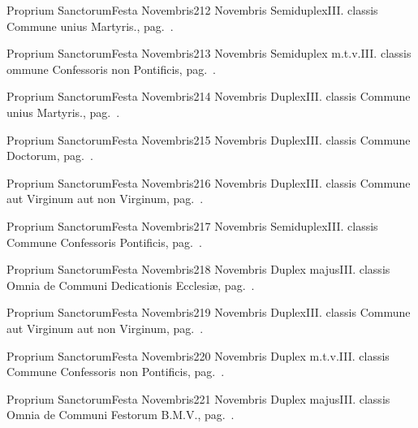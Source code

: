 \documentclass[nocturnale-romanum.tex]{subfiles}
\begin{document}
	{Proprium Sanctorum}{Festa Novembris}{2}{12 Novembris}
	{Semiduplex}{III. classis}
	{Commune unius Martyris., pag.\ \pageref{M-UMEX}.}
	{}

	{Proprium Sanctorum}{Festa Novembris}{2}{13 Novembris}
	{Semiduplex m.t.v.}{III. classis}
	{ommune Confessoris non Pontificis, pag.\ \pageref{M-CONP}.}
	{}

	{Proprium Sanctorum}{Festa Novembris}{2}{14 Novembris}
	{Duplex}{III. classis}
	{Commune unius Martyris., pag.\ \pageref{M-UMEX}.}
	{}

	{Proprium Sanctorum}{Festa Novembris}{2}{15 Novembris}
	{Duplex}{III. classis}
	{Commune Doctorum, pag.\ \pageref{M-CODO}.}
	{}

	{Proprium Sanctorum}{Festa Novembris}{2}{16 Novembris}
	{Duplex}{III. classis}
	{Commune aut Virginum aut non Virginum, pag.\ \pageref{M-MU}.}
	{}

	{Proprium Sanctorum}{Festa Novembris}{2}{17 Novembris}
	{Semiduplex}{III. classis}
	{Commune Confessoris Pontificis, pag.\ \pageref{M-COPO}.}
	{}

	{Proprium Sanctorum}{Festa Novembris}{2}{18 Novembris}
	{Duplex majus}{III. classis}
	{Omnia de Communi Dedicationis Ecclesiæ, pag.\ \pageref{M-CDED}.}
	{}

	{Proprium Sanctorum}{Festa Novembris}{2}{19 Novembris}
	{Duplex}{III. classis}
	{Commune aut Virginum aut non Virginum, pag.\ \pageref{M-MU}.}
	{}

	{Proprium Sanctorum}{Festa Novembris}{2}{20 Novembris}
	{Duplex m.t.v.}{III. classis}
	{Commune Confessoris non Pontificis, pag.\ \pageref{M-CONP}.}
	{}

	{Proprium Sanctorum}{Festa Novembris}{2}{21 Novembris}
	{Duplex majus}{III. classis}
	{Omnia de Communi Festorum B.M.V., pag.\ \pageref{M-CBMV}.}
	{}
\end{document}
